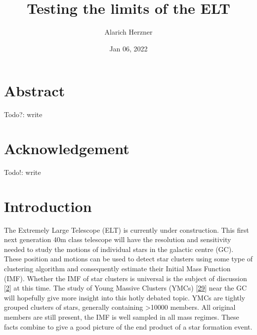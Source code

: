 \documentclass[letterpaper,10pt,english]{sphinxmanual}
\title{Testing the limits of the ELT}
\date{Jan 06, 2022}
\author{Alarich Herzner}
\begin{document}
\begin{figure}[htbp]
\centering
\capstart

\noindent{}

\end{figure}

\pagestyle{empty}
\sphinxmaketitle
\pagestyle{plain}
\sphinxtableofcontents
\pagestyle{normal}
\label{\detokenize{index::doc}}



\chapter{Abstract}
\label{\detokenize{NBodySimulation/Abstract:abstract}}\label{\detokenize{NBodySimulation/Abstract::doc}}
\sphinxAtStartPar
Todo?: write


\chapter{Acknowledgement}
\label{\detokenize{NBodySimulation/Acknowledgement:acknowledgement}}\label{\detokenize{NBodySimulation/Acknowledgement::doc}}
\sphinxAtStartPar
Todo!: write


\chapter{Introduction}
\label{\detokenize{NBodySimulation/Introduction:introduction}}\label{\detokenize{NBodySimulation/Introduction::doc}}
\sphinxAtStartPar
The Extremely Large Telescope (ELT) is currently under construction.
This first next generation 40m class telescope will have the resolution and sensitivity needed to study the motions of individual stars in the galactic centre (GC).
These position and motions can be used to detect star clusters using some type of clustering algorithm and consequently estimate their Initial Mass Function (IMF).
Whether the IMF of star clusters is universal is the subject of discussion {[}\hyperlink{cite.NBodySimulation/Appendix:id45}{2}{]} at this time.
The study of Young Massive Clusters (YMCs) {[}\hyperlink{cite.NBodySimulation/Appendix:id56}{29}{]} near the GC will hopefully give more insight into this hotly debated topic.
YMCs are tightly grouped clusters of stars, generally containing \textgreater{}10000 members.
All original members are still present, the IMF is well sampled in all mass regimes. These facts combine to give a good picture of the end product of a star formation event.
\end{document}
